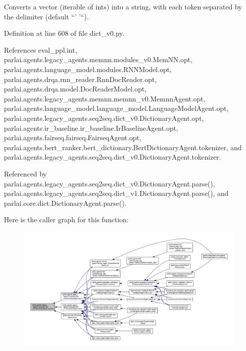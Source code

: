 \begin{DoxyVerb}Converts a vector (iterable of ints) into a string, with each token
separated by the delimiter (default ``' '``).
\end{DoxyVerb}
 

Definition at line 608 of file dict\+\_\+v0.\+py.



References eval\+\_\+ppl.\+int, parlai.\+agents.\+legacy\+\_\+agents.\+memnn.\+modules\+\_\+v0.\+Mem\+N\+N.\+opt, parlai.\+agents.\+language\+\_\+model.\+modules.\+R\+N\+N\+Model.\+opt, parlai.\+agents.\+drqa.\+rnn\+\_\+reader.\+Rnn\+Doc\+Reader.\+opt, parlai.\+agents.\+drqa.\+model.\+Doc\+Reader\+Model.\+opt, parlai.\+agents.\+legacy\+\_\+agents.\+memnn.\+memnn\+\_\+v0.\+Memnn\+Agent.\+opt, parlai.\+agents.\+language\+\_\+model.\+language\+\_\+model.\+Language\+Model\+Agent.\+opt, parlai.\+agents.\+legacy\+\_\+agents.\+seq2seq.\+dict\+\_\+v0.\+Dictionary\+Agent.\+opt, parlai.\+agents.\+ir\+\_\+baseline.\+ir\+\_\+baseline.\+Ir\+Baseline\+Agent.\+opt, parlai.\+agents.\+fairseq.\+fairseq.\+Fairseq\+Agent.\+opt, parlai.\+agents.\+bert\+\_\+ranker.\+bert\+\_\+dictionary.\+Bert\+Dictionary\+Agent.\+tokenizer, and parlai.\+agents.\+legacy\+\_\+agents.\+seq2seq.\+dict\+\_\+v0.\+Dictionary\+Agent.\+tokenizer.



Referenced by parlai.\+agents.\+legacy\+\_\+agents.\+seq2seq.\+dict\+\_\+v0.\+Dictionary\+Agent.\+parse(), parlai.\+agents.\+legacy\+\_\+agents.\+seq2seq.\+dict\+\_\+v1.\+Dictionary\+Agent.\+parse(), and parlai.\+core.\+dict.\+Dictionary\+Agent.\+parse().

Here is the caller graph for this function\+:
\nopagebreak
\begin{figure}[H]
\begin{center}
\leavevmode
\includegraphics[width=350pt]{classparlai_1_1agents_1_1legacy__agents_1_1seq2seq_1_1dict__v0_1_1DictionaryAgent_a87de974ecf69da7412e777220c29ba39_icgraph}
\end{center}
\end{figure}


